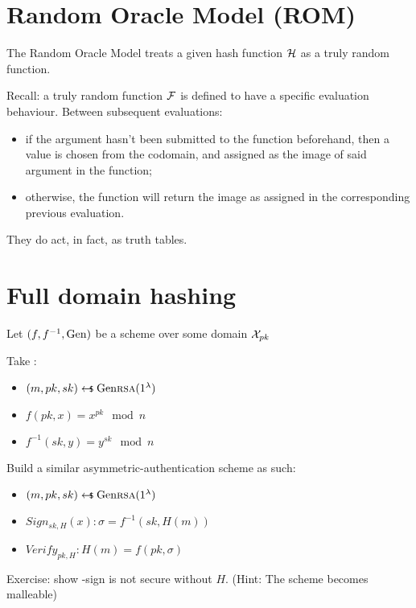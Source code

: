 \section{Random Oracle Model (ROM)}
The Random Oracle Model treats a given hash function $\mathcal{H}$ as a truly random function.

Recall: a truly random function $\mathcal{F}$ is defined to have a specific evaluation behaviour. Between subsequent evaluations:

\begin{itemize}
    \item if the argument hasn't been submitted to the function beforehand, then a value is chosen \uar{} from the codomain, and assigned as the image of said argument in the function;
    \item otherwise, the function will return the image as assigned in the corresponding previous evaluation.
\end{itemize}

They do act, in fact, as truth tables\footnotemark.


\section{Full domain hashing}

Let $(f, f^{-1}, \mathrm{Gen})$ be a \tdp{} scheme over some domain $\mathcal{X}_{pk}$

Take \rsa:
\begin{itemize}
    \item $(m, pk, sk) \pickUAR \Gen\rsa(1^\lambda)$
    \item $f(pk, x) = x^{pk} \mod n$
    \item $f^{-1}(sk, y) = y^{sk} \mod n$
\end{itemize}

Build a similar asymmetric-authentication scheme as such:

\begin{itemize}
    \item $(m, pk, sk) \pickUAR \Gen\rsa(1^\lambda)$
    \item $Sign_{sk, H}(x): \sigma = f^{-1}(sk, H(m))$
    \item $Verify_{pk, H}: H(m) = f(pk, \sigma)$
\end{itemize}

Exercise: show \rsa-sign is not secure without $H$. (Hint: The scheme becomes malleable)

